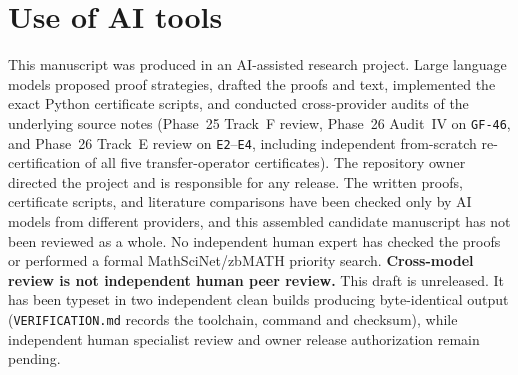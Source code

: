 \documentclass[11pt]{article}
\newcommand{\ttt}[1]{\texttt{\begingroup\def\_{\textunderscore\discretionary{}{}{}}#1\endgroup}}
\begin{document}
\section{Use of AI tools}\label{sec:ai}

This manuscript was produced in an AI-assisted research project. Large language models proposed proof strategies, drafted the proofs and text, implemented the exact Python certificate scripts, and conducted cross-provider audits of the underlying source notes (Phase~25 Track~F review, Phase~26 Audit~IV on \ttt{GF-46}, and Phase~26 Track~E review on \ttt{E2}--\ttt{E4}, including independent from-scratch re-certification of all five transfer-operator certificates). The repository owner directed the project and is responsible for any release. The written proofs, certificate scripts, and literature comparisons have been checked only by AI models from different providers, and this assembled candidate manuscript has not been reviewed as a whole. No independent human expert has checked the proofs or performed a formal MathSciNet/zbMATH priority search. \textbf{Cross-model review is not independent human peer review.} This draft is unreleased. It has been typeset in two independent clean builds producing byte-identical output (\ttt{VERIFICATION.md} records the toolchain, command and checksum), while independent human specialist review and owner release authorization remain pending.



\end{document}
